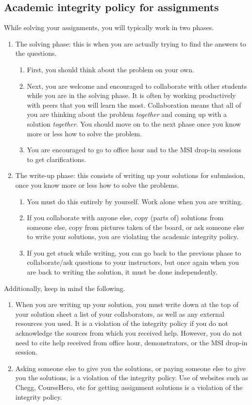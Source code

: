 \documentclass{amsart}
\begin{document}
\subsection{Academic integrity policy for assignments}
\label{sec:orgf090a14}
While solving your assignments, you will typically work in two phases.
\begin{enumerate}
\item The solving phase: this is when you are actually trying to find the answers to the questions.
\begin{enumerate}
\item First, you should think about the problem on your own.
\item Next, you are welcome and encouraged to collaborate with other students while you are in the solving phase. It is often by working productively with peers that you will learn the most. Collaboration means that all of you are thinking about the problem \emph{together} and coming up with a solution \emph{together}.
You should move on to the next phase once you know more or less how to solve the problem.
\item You are encouraged to go to office hour and to the MSI drop-in sessions to get clarifications.
\end{enumerate}
\item The write-up phase: this consists of writing up your solutions for submission, once you know more or less how to solve the problems.
\begin{enumerate}
\item You must do this entirely by yourself. Work alone when you are writing.
\item If you collaborate with anyone else, copy (parts of) solutions from someone else, copy from pictures taken of the board, or ask someone else to write your solutions, you are violating the academic integrity policy.
\item If you get stuck while writing, you can go back to the previous phase to collaborate/ask questions to your instructors, but once again when you are back to writing the solution, it must be done independently.
\end{enumerate}
\end{enumerate}


Additionally, keep in mind the following.
\begin{enumerate}
\item When you are writing up your solution, you must write down at the top of your solution sheet a list of your collaborators, as well as any external resources you used.
It is a violation of the integrity policy if you do not acknowledge the sources from which you received help.
However, you do not need to cite help received from office hour, demonstrators, or the MSI drop-in session.
\item Asking someone else to give you the solutions, or paying someone else to give you the solutions, is a violation of the integrity policy. Use of websites such as Chegg, CourseHero, etc for getting assignment solutions is a violation of the integrity policy.
\end{enumerate}
\end{document}
